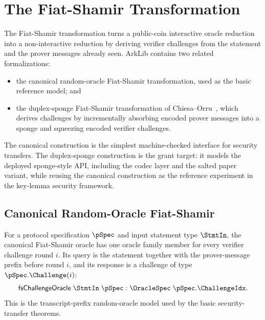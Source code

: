 \section{The Fiat-Shamir Transformation}\label{sec:fiat_shamir}

The Fiat-Shamir transformation turns a public-coin interactive oracle reduction into a
non-interactive reduction by deriving verifier challenges from the statement and the prover
messages already seen. ArkLib contains two related formalizations:

\begin{itemize}
    \item the canonical random-oracle Fiat-Shamir transformation, used as the basic reference
    model; and
    \item the duplex-sponge Fiat-Shamir transformation of Chiesa--Orru~\cite{CO25}, which
    derives challenges by incrementally absorbing encoded prover messages into a sponge and
    squeezing encoded verifier challenges.
\end{itemize}

The canonical construction is the simplest machine-checked interface for security transfers.
The duplex-sponge construction is the grant target: it models the deployed sponge-style API,
including the codec layer and the salted paper variant, while reusing the canonical construction
as the reference experiment in the key-lemma security framework.

\subsection{Canonical Random-Oracle Fiat-Shamir}\label{sec:fiat_shamir_canonical}

\begin{definition}
    \label{def:fiat_shamir_challenge_oracle_interface}
    For a protocol specification $\pSpec$ and input statement type $\StmtIn$, the canonical
    Fiat-Shamir oracle has one oracle family member for every verifier challenge round $i$.
    Its query is the statement together with the prover-message prefix before round $i$, and
    its response is a challenge of type $\pSpec.\Challenge(i)$:
    \[
        \mathsf{fsChallengeOracle}\;\StmtIn\;\pSpec
        : \OracleSpec\;\pSpec.\ChallengeIdx .
    \]
    This is the transcript-prefix random-oracle model used by the basic security-transfer
    theorems.
\end{definition}


